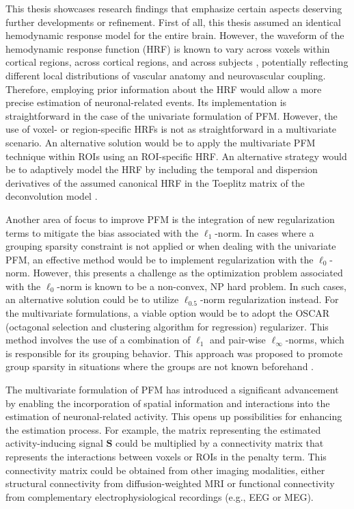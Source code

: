 This thesis showcases research findings that emphasize certain aspects deserving
further developments or refinement. First of all, this thesis assumed an
identical hemodynamic response model for the entire brain. However, the waveform
of the hemodynamic response function (HRF) is known to vary across voxels within
cortical regions, across cortical regions, and across subjects
\citep{Aguirre1998VariabilityHumanBOLD,Handwerker2004VariationBOLDhemodynamic,Miezin2000CharacterizingHemodynamicResponse,Zwart2005TemporaldynamicsBOLD,Saad2001AnalysisuseFMRI},
potentially reflecting different local distributions of vascular anatomy and
neurovascular coupling. Therefore, employing prior information about the HRF
would allow a more precise estimation of neuronal-related events. Its
implementation is straightforward in the case of the univariate formulation of
PFM. However, the use of voxel- or region-specific HRFs is not as
straightforward in a multivariate scenario. An alternative solution would be to
apply the multivariate PFM technique within ROIs using an ROI-specific HRF. An
alternative strategy would be to adaptively model the HRF by including the
temporal and dispersion derivatives of the assumed canonical HRF in the Toeplitz
matrix of the deconvolution model
\citep{Gaudes2012Structuredsparsedeconvolution}.

Another area of focus to improve PFM is the integration of new regularization
terms to mitigate the bias associated with the $\ell_1$-norm. In cases where a
grouping sparsity constraint is not applied or when dealing with the univariate
PFM, an effective method would be to implement regularization with the
$\ell_0$-norm. However, this presents a challenge as the optimization problem
associated with the $\ell_0$-norm is known to be a non-convex, NP hard problem.
In such cases, an alternative solution could be to utilize $\ell_{0.5}$-norm
regularization instead. For the multivariate formulations, a viable option would
be to adopt the OSCAR (octagonal selection and clustering algorithm for
regression) regularizer. This method involves the use of a combination of
$\ell_1$ and pair-wise $\ell_{\infty}$-norms, which is responsible for its
grouping behavior. This approach was proposed to promote group sparsity in
situations where the groups are not known beforehand
\citep{Bondell2008SimultaneousRegressionShrinkage,Gueddari2021CalibrationLessMulti}.

The multivariate formulation of PFM has introduced a significant advancement by
enabling the incorporation of spatial information and interactions into the
estimation of neuronal-related activity. This opens up possibilities for
enhancing the estimation process. For example, the matrix representing the
estimated activity-inducing signal $\mathbf{S}$ could be multiplied by a
connectivity matrix that represents the interactions between voxels or ROIs in
the penalty term. This connectivity matrix could be obtained from other imaging
modalities, either structural connectivity from diffusion-weighted MRI or
functional connectivity from complementary electrophysiological recordings
(e.g., EEG or MEG). 

